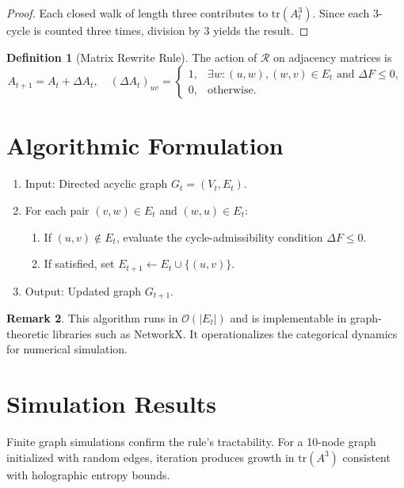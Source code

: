 \documentclass[11pt]{article}
\theoremstyle{definition}
\newtheorem{definition}{Definition}[section]
\newtheorem{remark}[definition]{Remark}
\begin{document}
\begin{proof}
Each closed walk of length three contributes to $\mathrm{tr}(A_t^3)$. Since each 3-cycle is counted three times, division by $3$ yields the result.
\end{proof}

\begin{definition}[Matrix Rewrite Rule]
The action of $\mathcal{R}$ on adjacency matrices is
\[
A_{t+1} = A_t + \Delta A_t, \quad
(\Delta A_t)_{uv} =
\begin{cases}
1, & \exists w : (u,w),(w,v) \in E_t \text{ and } \Delta F \leq 0, \\
0, & \text{otherwise}.
\end{cases}
\]
\end{definition}

\section{Algorithmic Formulation}

\begin{algorithm}
\hfill
\begin{enumerate}
    \item Input: Directed acyclic graph $G_t = (V_t,E_t)$.
    \item For each pair $(v,w) \in E_t$ and $(w,u) \in E_t$:
    \begin{enumerate}
        \item If $(u,v) \notin E_t$, evaluate the cycle-admissibility condition $\Delta F \leq 0$.
        \item If satisfied, set $E_{t+1} \gets E_t \cup \{(u,v)\}$.
    \end{enumerate}
    \item Output: Updated graph $G_{t+1}$.
\end{enumerate}
\end{algorithm}

\begin{remark}
This algorithm runs in $\mathcal{O}(|E_t|)$ and is implementable in graph-theoretic libraries such as NetworkX. It operationalizes the categorical dynamics for numerical simulation.
\end{remark}

\section{Simulation Results}

Finite graph simulations confirm the rule’s tractability. For a 10-node graph initialized with random edges, iteration produces growth in $\mathrm{tr}(A^3)$ consistent with holographic entropy bounds.
\end{document}
